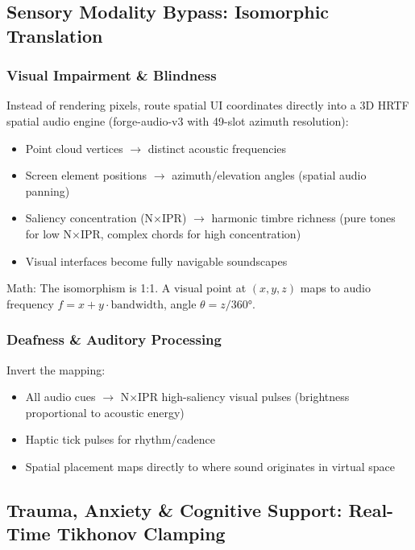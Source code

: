 \documentclass[11pt,oneside]{article}
\theoremstyle{definition}
\begin{document}
\subsection{Sensory Modality Bypass: Isomorphic Translation}

\subsubsection{Visual Impairment \& Blindness}

Instead of rendering pixels, route spatial UI coordinates directly into a 3D HRTF spatial audio engine (forge-audio-v3 with 49-slot azimuth resolution):

\begin{itemize}
  \item Point cloud vertices $\to$ distinct acoustic frequencies
  \item Screen element positions $\to$ azimuth/elevation angles (spatial audio panning)
  \item Saliency concentration (N×IPR) $\to$ harmonic timbre richness (pure tones for low N×IPR, complex chords for high concentration)
  \item Visual interfaces become fully navigable soundscapes
\end{itemize}

Math: The isomorphism is 1:1. A visual point at $(x, y, z)$ maps to audio frequency $f = x + y \cdot \text{bandwidth}$, angle $\theta = z / 360°$.

\subsubsection{Deafness \& Auditory Processing}

Invert the mapping:
\begin{itemize}
  \item All audio cues $\to$ N×IPR high-saliency visual pulses (brightness proportional to acoustic energy)
  \item Haptic tick pulses for rhythm/cadence
  \item Spatial placement maps directly to where sound originates in virtual space
\end{itemize}

\subsection{Trauma, Anxiety \& Cognitive Support: Real-Time Tikhonov Clamping}
\end{document}
